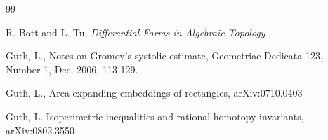 \documentclass{amsart}
\newtheorem*{theorem 1}{Theorem 1}
\newtheorem*{theorem 2}{Theorem 2}
\newtheorem*{theorem 3}{Theorem 3}
\numberwithin{equation}{section}
\begin{document}
\begin{thebibliography}{99}

 R. Bott and L. Tu,  {\it Differential Forms in Algebraic Topology}

 Guth, L., Notes on Gromov's systolic estimate,
Geometriae Dedicata 123, Number 1, Dec. 2006, 113-129.

 Guth, L., Area-expanding embeddings of rectangles, arXiv:0710.0403 

 Guth, L.  Isoperimetric inequalities and rational homotopy invariants, arXiv:0802.3550 


\end{thebibliography}
\end{document}
